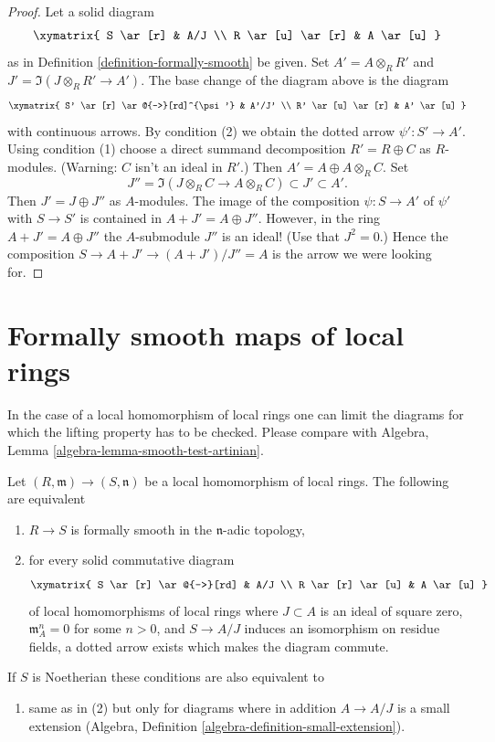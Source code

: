 \begin{proof}
Let a solid diagram
$$
\xymatrix{
S \ar[r] & A/J \\
R \ar[u] \ar[r] & A \ar[u]
}
$$
as in Definition \ref{definition-formally-smooth} be given.
Set $A' = A \otimes_R R'$ and $J' = \Im(J \otimes_R R' \to A')$.
The base change of the diagram above is the diagram
$$
\xymatrix{
S' \ar[r] \ar@{-->}[rd]^{\psi'} & A'/J' \\
R' \ar[u] \ar[r] & A' \ar[u]
}
$$
with continuous arrows. By condition (2) we obtain the dotted arrow
$\psi' : S' \to A'$. Using condition (1) choose a direct summand decomposition
$R' = R \oplus C$ as $R$-modules. (Warning: $C$ isn't an ideal in $R'$.)
Then $A' = A \oplus A \otimes_R C$. Set
$$
J'' = \Im(J \otimes_R C \to A \otimes_R C) \subset J' \subset A'.
$$
Then $J' = J \oplus J''$ as $A$-modules. The image of the composition
$\psi : S \to A'$ of $\psi'$ with $S \to S'$ is contained in
$A + J' = A \oplus J''$. However, in the ring $A + J' = A \oplus J''$
the $A$-submodule $J''$ is an ideal! (Use that $J^2 = 0$.) Hence the
composition $S \to A + J' \to (A + J')/J'' = A$ is the arrow we were
looking for.
\end{proof}








\section{Formally smooth maps of local rings}
\label{section-formally-smooth-local}

\noindent
In the case of a local homomorphism of local rings one can
limit the diagrams for which the lifting property has to be checked.
Please compare with Algebra, Lemma \ref{algebra-lemma-smooth-test-artinian}.

\begin{lemma}
\label{lemma-fs-local}
Let $(R, \mathfrak m) \to (S, \mathfrak n)$ be a local homomorphism
of local rings. The following are equivalent
\begin{enumerate}
\item $R \to S$ is formally smooth in the $\mathfrak n$-adic topology,
\item for every solid commutative diagram
$$
\xymatrix{
S \ar[r] \ar@{-->}[rd] & A/J \\
R \ar[r] \ar[u] & A \ar[u]
}
$$
of local homomorphisms of local rings where $J \subset A$ is
an ideal of square zero, $\mathfrak m_A^n = 0$ for some $n > 0$, and
$S \to A/J$ induces an isomorphism on residue fields, a dotted
arrow exists which makes the diagram commute.
\end{enumerate}
If $S$ is Noetherian these conditions are also equivalent to
\begin{enumerate}
\item[(3)] same as in (2) but only for diagrams where in addition
$A \to A/J$ is a small extension
(Algebra, Definition \ref{algebra-definition-small-extension}).
\end{enumerate}
\end{lemma}

